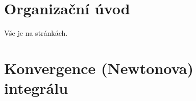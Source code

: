 \documentclass[12pt]{article}					%
\begin{document}

\section*{Organizační úvod}
	\begin{poznamka}
		Vše je na stránkách.
	\end{poznamka}

\section*{Konvergence (Newtonova) integrálu}
	
\end{document}
